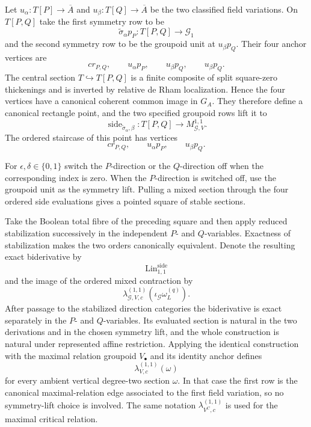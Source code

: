 \begin{construction}
\label{constr:symmetry-noether-ordered-side-evaluation}
Let $u_\alpha:T[P]\to\overline A$ and $u_\beta:T[Q]\to\overline A$ be the two
classified field variations.  On $T[P,Q]$ take the first symmetry row to be
\[
\widetilde\sigma_\alpha p_P:T[P,Q]\longrightarrow\mathcal G_1
\]
and the second symmetry row to be the groupoid unit at $u_\beta p_Q$.
Their four anchor vertices are
\[
cr_{P,Q},\qquad
u_\alpha p_P,\qquad
u_\beta p_Q,\qquad
u_\beta p_Q.
\]
The central section $T\hookrightarrow T[P,Q]$ is a finite composite of split
square-zero thickenings and is inverted by relative de Rham localization.  Hence
the four vertices have a canonical coherent common image in $G_A$.  They therefore
define a canonical rectangle point, and the two specified groupoid rows lift it to
\[
\boxed{
\operatorname{side}_{\widetilde\sigma_\alpha,\beta}:
T[P,Q]
\longrightarrow
M_{\mathcal G,V}^{1,1}.
}
\]
The ordered staircase of this point has vertices
\[
cr_{P,Q},\qquad
u_\alpha p_P,\qquad
u_\beta p_Q.
\]
\end{construction}

For $\epsilon,\delta\in\{0,1\}$ switch the $P$-direction or the $Q$-direction off
when the corresponding index is zero.  When the $P$-direction is switched off,
use the groupoid unit as the symmetry lift.  Pulling a mixed section through the
four ordered side evaluations gives a pointed square of stable sections.

\begin{construction}
\label{constr:symmetry-noether-exact-one-one-side-linearization}
Take the Boolean total fibre of the preceding square and then apply reduced
stabilization successively in the independent $P$- and $Q$-variables.  Exactness of
stabilization makes the two orders canonically equivalent.  Denote the resulting
exact biderivative by
\[
\operatorname{Lin}_{1,1}^{\mathrm{side}}
\]
and the image of the ordered mixed contraction by
\[
\lambda_{\mathcal G,V,c}^{(1,1)}
\left(\iota_{\mathcal G}\omega_L^{(q)}\right).
\]
After passage to the stabilized direction categories the biderivative is exact
separately in the $P$- and $Q$-variables.  Its evaluated section is natural in the
two derivations and in the chosen symmetry lift, and the whole construction is
natural under represented affine restriction.  Applying the identical construction
with the maximal relation groupoid $V_\bullet$ and its identity anchor defines
\[
\lambda_{V,c}^{(1,1)}(\omega)
\]
for every ambient vertical degree-two section $\omega$.  In that case the first row
is the canonical maximal-relation edge associated to the first field variation, so
no symmetry-lift choice is involved.  The same notation $\lambda_{V^C,c}^{(1,1)}$
is used for the maximal critical relation.
\end{construction}

